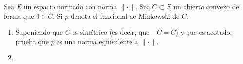 \begin{ejercicio}
    Sea $E$ un espacio normado con norma $\|\cdot \|$. Sea $C\subset E$ un abierto convexo de forma que $0\in C$. Si $p$ denota el funcional de Minkowski de $C$:
    \begin{enumerate}[label=\alph*)]
        \item Suponiendo que $C$ es simétrico (es decir, que $-C=C$) y que es acotado, prueba que $p$ es una norma equivalente a $\|\cdot \|$.
        \item %
    \end{enumerate}
\end{ejercicio}



